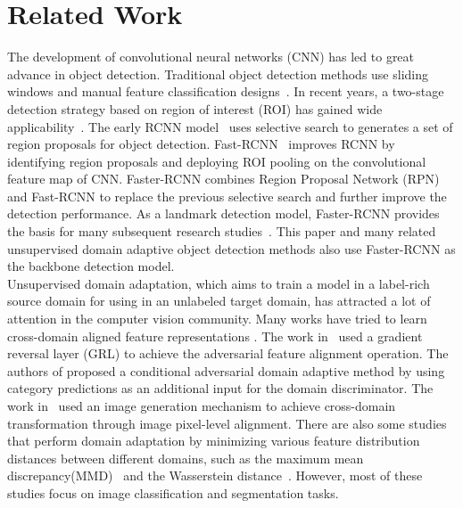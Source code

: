 \documentclass[runningheads]{llncs}
\begin{document}
\section{Related Work}
The development of convolutional neural networks (CNN) has led to great advance in object detection.
Traditional object detection methods use sliding windows and manual feature classification designs~\cite{Navneet2005H,Felzenszwalb2010Object}. 
In recent years, a two-stage detection strategy based on region of interest (ROI) 
has gained wide applicability~\cite{girshick2014rich,girshick2015fast,ren2015faster}. 
The early RCNN model~\cite{girshick2014rich} uses selective search to generates a set of region proposals for object detection. 
Fast-RCNN~\cite{girshick2015fast} improves RCNN by identifying region proposals and deploying ROI pooling on the convolutional feature map of CNN.
Faster-RCNN \cite{ren2015faster} 
combines Region Proposal Network (RPN) and Fast-RCNN to replace the previous selective search and 
further improve the detection performance. 
As a landmark detection model, Faster-RCNN provides the basis for many subsequent research studies~\cite{liu2016ssd,Redmon2016You,lin2017feature,he2017mask}. 
This paper and many related unsupervised domain adaptive object detection methods 
also use Faster-RCNN as the backbone detection model.\\

Unsupervised domain adaptation, which aims to train a model in a label-rich source domain 
for using in an unlabeled target domain, has attracted a lot of attention in the computer vision community. 
Many works have tried to learn cross-domain aligned feature representations
\cite{dziugaite2015training,ganin2016domain,shen2017wasserstein,long2018conditional,choi2019self}. 
The work in~\cite{ganin2016domain} used a gradient reversal layer (GRL) to achieve the adversarial feature alignment operation.
The authors of \cite{long2018conditional} proposed a
conditional adversarial domain adaptive method by using category predictions as an additional input for the domain discriminator. 
The work in~\cite{choi2019self} used an image generation mechanism to achieve cross-domain transformation through image pixel-level alignment. 
There are also some studies that perform domain adaptation by minimizing various feature distribution distances between different domains,
such as 
the maximum mean discrepancy(MMD)~\cite{dziugaite2015training} and the Wasserstein distance~\cite{shen2017wasserstein}. 
However, most of these studies focus on image classification and segmentation tasks.\\
\end{document}
